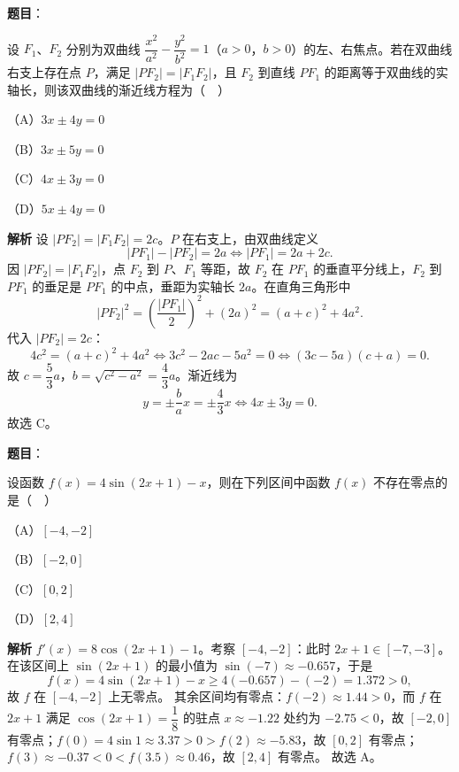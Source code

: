 \begin{answer}

\textbf{题目}：

设 $F_1$、$F_2$ 分别为双曲线 $\dfrac{x^2}{a^2}-\dfrac{y^2}{b^2}=1$（$a>0$，$b>0$）的左、右焦点。若在双曲线右支上存在点 $P$，满足 $|PF_2|=|F_1F_2|$，且 $F_2$ 到直线 $PF_1$ 的距离等于双曲线的实轴长，则该双曲线的渐近线方程为（　）

（A）$3x\pm 4y=0$

（B）$3x\pm 5y=0$

（C）$4x\pm 3y=0$

（D）$5x\pm 4y=0$

\textbf{解析}
设 $|PF_2|=|F_1F_2|=2c$。$P$ 在右支上，由双曲线定义
\nopagebreak[4]
\[|PF_1|-|PF_2|=2a\iff |PF_1|=2a+2c.\]
因 $|PF_2|=|F_1F_2|$，点 $F_2$ 到 $P$、$F_1$ 等距，故 $F_2$ 在 $PF_1$ 的垂直平分线上，$F_2$ 到 $PF_1$ 的垂足是 $PF_1$ 的中点，垂距为实轴长 $2a$。在直角三角形中
\nopagebreak[4]
\[|PF_2|^2=\left(\frac{|PF_1|}2\right)^2+(2a)^2=(a+c)^2+4a^2.\]
代入 $|PF_2|=2c$：
\nopagebreak[4]
\[4c^2=(a+c)^2+4a^2\iff 3c^2-2ac-5a^2=0\iff(3c-5a)(c+a)=0.\]
故 $c=\dfrac53a$，$b=\sqrt{c^2-a^2}=\dfrac43a$。渐近线为
\nopagebreak[4]
\[y=\pm\frac bax=\pm\frac43x\iff 4x\pm3y=0.\]
故选 C。


\end{answer}
\begin{answer}

\textbf{题目}：

设函数 $f(x)=4\sin(2x+1)-x$，则在下列区间中函数 $f(x)$ 不存在零点的是（　）

（A）$[-4,-2]$

（B）$[-2,0]$

（C）$[0,2]$

（D）$[2,4]$

\textbf{解析}
$f'(x)=8\cos(2x+1)-1$。考察 $[-4,-2]$：此时 $2x+1\in[-7,-3]$。在该区间上 $\sin(2x+1)$ 的最小值为 $\sin(-7)\approx-0.657$，于是
\nopagebreak[4]
\[f(x)=4\sin(2x+1)-x\geqslant4(-0.657)-(-2)=1.372>0,\]
故 $f$ 在 $[-4,-2]$ 上无零点。
其余区间均有零点：$f(-2)\approx1.44>0$，而 $f$ 在 $2x+1$ 满足 $\cos(2x+1)=\dfrac18$ 的驻点 $x\approx-1.22$ 处约为 $-2.75<0$，故 $[-2,0]$ 有零点；$f(0)=4\sin1\approx3.37>0>f(2)\approx-5.83$，故 $[0,2]$ 有零点；$f(3)\approx-0.37<0<f(3.5)\approx0.46$，故 $[2,4]$ 有零点。
故选 A。


\end{answer}

